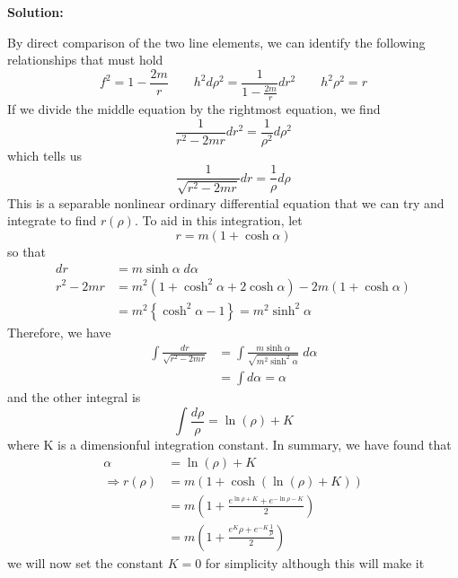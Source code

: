 \documentclass[a4paper, 11pt]{article}
\newenvironment{solution}{%
  \noindent\textbf{Solution: }
	\begin{list}{}{%
			\setlength{\topsep}{0pt}%
			\setlength{\leftmargin}{0.5cm}%
			\setlength{\rightmargin}{0.5cm}%
			\setlength{\listparindent}{\parindent}%
			\setlength{\itemindent}{\parindent}%
			\setlength{\parsep}{\parskip}%
		}%
		\item[]}{\end{list}}
\begin{document}
\begin{enumerate}[leftmargin=0em, label=\textbf{\arabic*}.]
  \begin{solution}
    By direct comparison of the two line elements, we can identify the following
    relationships that must hold
    \begin{equation}
      f^2 = 1-\frac{2m}{r} \qquad h^2d\rho^2 = \frac{1}{1-\frac{2m}{r}}dr^2 \qquad h^2\rho^2 = r
    \end{equation}
    If we divide the middle equation by the rightmost equation, we find
    \begin{equation}
      \frac{1}{r^2-2mr}dr^2 = \frac{1}{\rho^2}d\rho^2
    \end{equation}
    which tells us
    \begin{equation}
      \frac{1}{\sqrt{r^2-2mr}} dr = \frac{1}{\rho}d\rho
    \end{equation}
    This is a separable nonlinear ordinary differential equation that we can try
    and integrate to find $r(\rho)$. To aid in this integration, let
    \begin{equation}
      r = m(1+\cosh\alpha)
    \end{equation}
    so that
    \begin{align}
      dr &= m\sinh\alpha\; d\alpha\\
      r^2-2mr &= m^2(1+\cosh^2\alpha+2\cosh\alpha)-2m(1+\cosh\alpha)\\
      &= m^2\left\{ \cosh^2\alpha-1 \right\} = m^2\sinh^2\alpha
    \end{align}
    Therefore, we have
    \begin{align}
      \int \frac{dr}{\sqrt{r^2-2mr}} &= \int \frac{m\sinh\alpha}{\sqrt{m^2\sinh^2\alpha}} \;d\alpha\\
      &= \int d\alpha = \alpha
    \end{align}
    and the other integral is
    \begin{equation}
      \int \frac{d\rho}{\rho} = \ln(\rho)+K
    \end{equation}
    where K is a dimensionful integration constant. In summary, we have found that
    \begin{align}
      \alpha &= \ln(\rho)+K \\
      \Rightarrow r(\rho) &= m(1+\cosh(\ln(\rho)+K)) \\
             &= m\left( 1 + \frac{e^{\ln\rho + K}+e^{-\ln\rho-K}}{2} \right) \\
      &= m\left( 1+\frac{e^K\rho+e^{-K}\frac{1}{\rho}}{2} \right)
    \end{align}
    we will now set the constant $K=0$ for simplicity although this will make it

\end{solution}
\end{enumerate}
\end{document}
